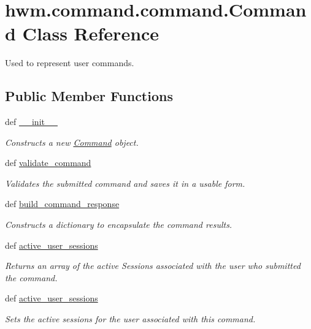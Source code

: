 \hypertarget{classhwm_1_1command_1_1command_1_1_command}{\section{hwm.\-command.\-command.\-Command Class Reference}
\label{classhwm_1_1command_1_1command_1_1_command}
}


Used to represent user commands.  


\subsection*{Public Member Functions}
\begin{DoxyCompactItemize}
\item 
def \hyperlink{classhwm_1_1command_1_1command_1_1_command_a7414e169b208f1463e06b069f2bfaa49}{\-\_\-\-\_\-init\-\_\-\-\_\-}
\begin{DoxyCompactList}\small\item\em Constructs a new \hyperlink{classhwm_1_1command_1_1command_1_1_command}{Command} object. \end{DoxyCompactList}\item 
def \hyperlink{classhwm_1_1command_1_1command_1_1_command_a763fc9cd17687d87e666b53c35e1f2ae}{validate\-\_\-command}
\begin{DoxyCompactList}\small\item\em Validates the submitted command and saves it in a usable form. \end{DoxyCompactList}\item 
def \hyperlink{classhwm_1_1command_1_1command_1_1_command_af5c02927dff3849f37e3c9281bfad3a3}{build\-\_\-command\-\_\-response}
\begin{DoxyCompactList}\small\item\em Constructs a dictionary to encapsulate the command results. \end{DoxyCompactList}\item 
def \hyperlink{classhwm_1_1command_1_1command_1_1_command_a92bcc620aef36c5ce6d51b857ed04ab0}{active\-\_\-user\-\_\-sessions}
\begin{DoxyCompactList}\small\item\em Returns an array of the active Sessions associated with the user who submitted the command. \end{DoxyCompactList}\item 
def \hyperlink{classhwm_1_1command_1_1command_1_1_command_a92bcc620aef36c5ce6d51b857ed04ab0}{active\-\_\-user\-\_\-sessions}
\begin{DoxyCompactList}\small\item\em Sets the active sessions for the user associated with this command. \end{DoxyCompactList}\end{DoxyCompactItemize}
